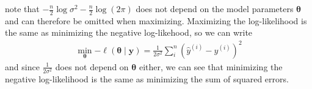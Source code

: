 note that $-\frac{n}{2} \log \sigma^{2}-\frac{n}{2} \log (2 \pi)$ does not depend on the model parameters $\boldsymbol{\theta}$ and can therefore be omitted when maximizing. Maximizing the log-likelihood is the same as minimizing the negative log-likehood, so we can write 
\begin{equation*}
\begin{split}
        \min_{\boldsymbol{\theta}}{-\ell(\boldsymbol{\theta}\mid \boldsymbol{y})}=\frac{1}{2 \sigma^{2}} \sum_{i}^n\left(\hat{y}^{(i)}-y^{(i)}\right)^{2}
\end{split}
\end{equation*}
and since $\frac{1}{2 \sigma^{2}}$ does not depend on $\boldsymbol{\theta}$ either, we can see that minimizing the negative log-likelihood is the same as minimizing the sum of squared errors. 



